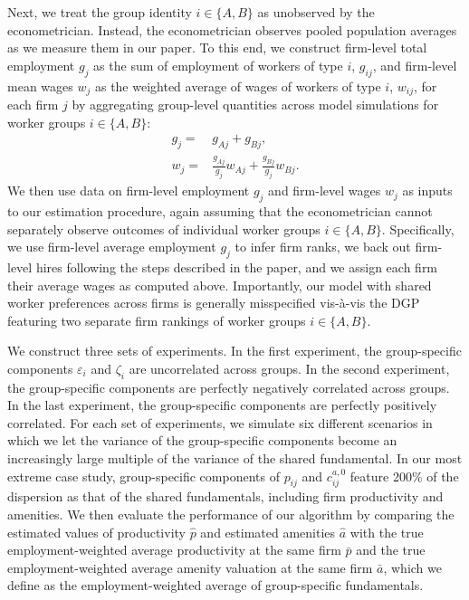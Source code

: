 Next, we treat the group identity $i \in \{ A, B \}$ as unobserved by the econometrician. Instead, the econometrician observes pooled population averages as we measure them in our paper. To this end, we construct firm-level total employment $g_{j}$ as the sum of employment of workers of type $i$, $g_{ij}$, and firm-level mean wages $w_{j}$ as the weighted average of wages of workers of type $i$, $w_{ij}$, for each firm $j$ by aggregating group-level quantities across model simulations for worker groups $i \in \{ A, B \}$:
%
\begin{align*}
    g_{j} = & g_{Aj} + g_{Bj}, \\
    w_{j} = & \frac{g_{Aj}}{g_{j}} w_{Aj} + \frac{g_{Bj}}{g_{j}} w_{Bj}.
\end{align*}
%
We then use data on firm-level employment $g_{j}$ and firm-level wages $w_{j}$ as inputs to our estimation procedure, again assuming that the econometrician cannot separately observe outcomes of individual worker groups $i \in \{ A, B \}$. Specifically, we use firm-level average employment $g_{j}$ to infer firm ranks, we back out firm-level hires following the steps described in the paper, and we assign each firm their average wages as computed above. Importantly, our model with shared worker preferences across firms is generally misspecified vis-{\`{a}}-vis the DGP featuring two separate firm rankings of worker groups $i \in \{ A, B \}$.

We construct three sets of experiments. In the first experiment, the group-specific components $\varepsilon_{i}$ and $\zeta_{i}$ are uncorrelated across groups. In the second experiment, the group-specific components are perfectly negatively correlated across groups. In the last experiment, the group-specific components are perfectly positively correlated. For each set of experiments, we simulate six different scenarios in which we let the variance of the group-specific components become an increasingly large multiple of the variance of the shared fundamental. In our most extreme case study, group-specific components of $p_{ij}$ and $c_{ij}^{a, 0}$ feature 200\% of the dispersion as that of the shared fundamentals, including firm productivity and amenities. We then evaluate the performance of our algorithm by comparing the estimated values of productivity $\hat{p}$ and estimated amenities $\hat{a}$ with the true employment-weighted average productivity at the same firm $\bar{p}$ and the true employment-weighted average amenity valuation at the same firm $\bar{a}$, which we define as the employment-weighted average of group-specific fundamentals.


